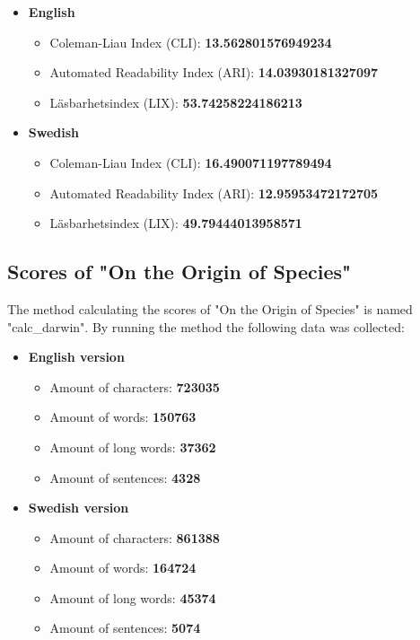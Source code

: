 \documentclass[a4paper]{article}
\begin{document}
\begin{itemize}
    \item \textbf{English}
    \begin{itemize}
        \item Coleman-Liau Index (CLI): \textbf{13.562801576949234}
        \item Automated Readability Index (ARI): \textbf{14.03930181327097}
        \item Läsbarhetsindex (LIX): \textbf{53.74258224186213}
    \end{itemize}
    \item \textbf{Swedish}
    \begin{itemize}
        \item Coleman-Liau Index (CLI): \textbf{16.490071197789494}
        \item Automated Readability Index (ARI): \textbf{12.95953472172705}
        \item Läsbarhetsindex (LIX): \textbf{49.79444013958571}
    \end{itemize}
\end{itemize}

\subsection{Scores of "On the Origin of Species"}
The method calculating the scores of "On the Origin of Species" is named "calc\_darwin". By running the method the following data was collected:

\begin{itemize}
	\item \textbf{English version}
	\begin{itemize}
		\item Amount of characters: \textbf{723035}
		\item Amount of words: \textbf{150763}
		\item Amount of long words: \textbf{37362}
		\item Amount of sentences: \textbf{4328}
	\end{itemize}
	\item \textbf{Swedish version}
	\begin{itemize}
		\item Amount of characters: \textbf{861388}
		\item Amount of words: \textbf{164724}
		\item Amount of long words: \textbf{45374}
		\item Amount of sentences: \textbf{5074}
	\end{itemize}
\end{itemize}
\end{document}
